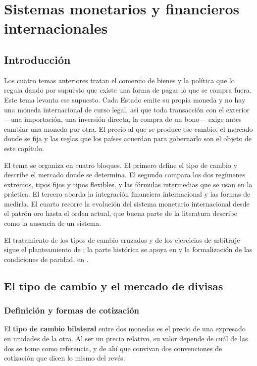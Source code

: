 \chapter{Sistemas monetarios y financieros internacionales}

\section{Introducción}

Los cuatro temas anteriores tratan el comercio de bienes y la política que lo
regula dando por supuesto que existe una forma de pagar lo que se compra fuera.
Este tema levanta ese supuesto. Cada Estado emite su propia moneda y no hay una
moneda internacional de curso legal, así que toda transacción con el exterior
—una importación, una inversión directa, la compra de un bono— exige antes
cambiar una moneda por otra. El precio al que se produce ese cambio, el mercado
donde se fija y las reglas que los países acuerdan para gobernarlo son el objeto
de este capítulo.

El tema se organiza en cuatro bloques. El primero define el tipo de cambio y
describe el mercado donde se determina. El segundo compara los dos regímenes
extremos, tipos fijos y tipos flexibles, y las fórmulas intermedias que se usan
en la práctica. El tercero aborda la integración financiera internacional y las
formas de medirla. El cuarto recorre la evolución del sistema monetario
internacional desde el patrón oro hasta el orden actual, que buena parte de la
literatura describe como la ausencia de un sistema.

El tratamiento de los tipos de cambio cruzados y de los ejercicios de arbitraje
sigue el planteamiento de \textcite{bengochea2009}; la parte histórica se apoya
en \textcite{requeijo2021} y la formalización de las condiciones de paridad, en
\textcite{feenstra2021macro}.

\section{El tipo de cambio y el mercado de divisas}

\subsection{Definición y formas de cotización}

El \textbf{tipo de cambio bilateral} entre dos monedas es el precio de una
expresado en unidades de la otra. Al ser un precio relativo, su valor depende de
cuál de las dos se tome como referencia, y de ahí que convivan dos convenciones
de cotización que dicen lo mismo del revés.

